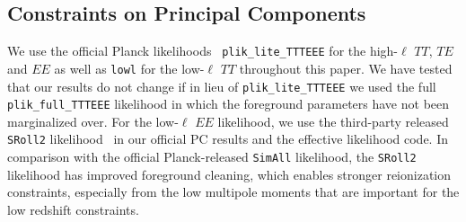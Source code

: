 \documentclass[aps,prd,twocolumn,amsmath,amssymb,showpacs,floatfix,superscriptaddress,nofootinbib]{revtex4-1}
\begin{document}
\subsection{Constraints on Principal Components}
We use the official Planck likelihoods~\cite{Aghanim:2019ame} \texttt{plik\_lite\_TTTEEE} for the high-$\ell$ $TT$, $TE$ and $EE$ as well as \texttt{lowl} for the low-$\ell$ $TT$ throughout this paper. We have tested that our results do not change if in lieu of \texttt{plik\_lite\_TTTEEE} we used the full \texttt{plik\_full\_TTTEEE} likelihood in which the foreground parameters have not been marginalized over. For the low-$\ell$ $EE$ likelihood, we use the third-party released \texttt{SRoll2} likelihood~\cite{Delouis:2019bub} in our official PC results and the effective likelihood code. In comparison with the official Planck-released \texttt{SimAll} likelihood, the \texttt{SRoll2} likelihood has improved foreground cleaning, 
which enables stronger reionization constraints, especially from the low multipole moments that are important for the low redshift constraints.
\end{document}

